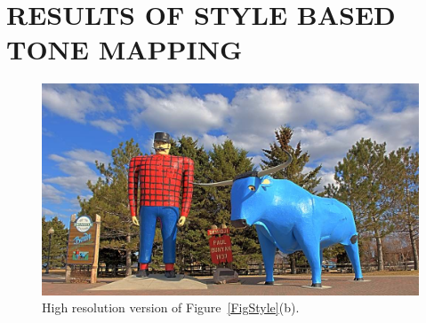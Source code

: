 \chapter{RESULTS OF STYLE BASED TONE MAPPING}
\label{app:results}


\begin{figure}
\begin{center}
\includegraphics[width=\textwidth]{figures/chapter5/style_based/PaulBunyan_hdrcandy_v2_small.jpg}
\caption{High resolution version of Figure~\ref{FigStyle}(b).}
\end{center}
\end{figure}


